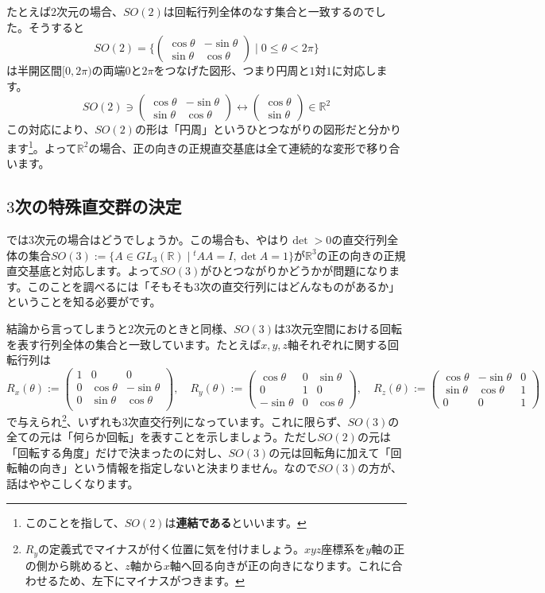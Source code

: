 たとえば$2$次元の場合、$SO(2)$は回転行列全体のなす集合と一致するのでした。そうすると
\[
SO(2) = 
\biggl\{
\begin{pmatrix}
\cos \theta & -\sin \theta \\
\sin \theta & \cos \theta
\end{pmatrix}
\mid 0 \leq \theta < 2\pi
\biggr\}
\]
は半開区間$[0, 2\pi)$の両端$0$と$2\pi$をつなげた図形、つまり円周と$1$対$1$に対応します。
\[
SO(2) \ni
\begin{pmatrix}
\cos \theta & -\sin \theta \\
\sin \theta & \cos \theta
\end{pmatrix}
\longleftrightarrow
\begin{pmatrix}
\cos \theta \\
\sin \theta
\end{pmatrix}
\in \mathbb{R}^2
\]
この対応により、$SO(2)$の形は「円周」というひとつながりの図形だと分かります\footnote{このことを指して、$SO(2)$は\textbf{連結である}といいます。}。よって$\mathbb{R}^2$の場合、正の向きの正規直交基底は全て連続的な変形で移り合います。

\subsection{$3$次の特殊直交群の決定}

では$3$次元の場合はどうでしょうか。この場合も、やはり$\det > 0$の直交行列全体の集合$SO(3) := \{ A \in GL_3(\mathbb{R}) \mid {}^t\!A A = I, \det A = 1\}$が$\mathbb{R}^3$の正の向きの正規直交基底と対応します。よって$SO(3)$がひとつながりかどうかが問題になります。このことを調べるには「そもそも$3$次の直交行列にはどんなものがあるか」ということを知る必要がです。

結論から言ってしまうと$2$次元のときと同様、$SO(3)$は$3$次元空間における回転を表す行列全体の集合と一致しています。たとえば$x, y, z$軸それぞれに関する回転行列は
\[
R_x(\theta) :=
\begin{pmatrix}
1 & 0 & 0 \\
0 & \cos \theta & -\sin \theta \\
0 & \sin \theta & \cos \theta \\
\end{pmatrix}, \quad
R_y(\theta) :=
\begin{pmatrix}
\cos \theta & 0 & \sin \theta \\
0 & 1 & 0 \\
-\sin \theta & 0 & \cos \theta
\end{pmatrix}, \quad
R_z(\theta) :=
\begin{pmatrix}
\cos \theta & -\sin \theta & 0 \\
\sin \theta & \cos \theta & 1 \\
0 & 0 & 1
\end{pmatrix}
\]
で与えられ\footnote{$R_y$の定義式でマイナスが付く位置に気を付けましょう。$xyz$座標系を$y$軸の正の側から眺めると、$z$軸から$x$軸へ回る向きが正の向きになります。これに合わせるため、左下にマイナスがつきます。}、いずれも$3$次直交行列になっています。これに限らず、$SO(3)$の全ての元は「何らか回転」を表すことを示しましょう。ただし$SO(2)$の元は「回転する角度」だけで決まったのに対し、$SO(3)$の元は回転角に加えて「回転軸の向き」という情報を指定しないと決まりません。なので$SO(3)$の方が、話はややこしくなります。


